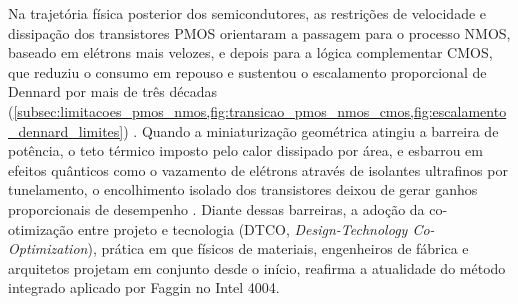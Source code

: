 Na trajetória física posterior dos semicondutores, as restrições de velocidade e dissipação dos transistores PMOS orientaram a passagem para o processo NMOS, baseado em elétrons mais velozes, e depois para a lógica complementar CMOS, que reduziu o consumo em repouso e sustentou o escalamento proporcional de Dennard por mais de três décadas (\cref{subsec:limitacoes_pmos_nmos,fig:transicao_pmos_nmos_cmos,fig:escalamento_dennard_limites}) \cite{dennard1974, mead1980}. Quando a miniaturização geométrica atingiu a barreira de potência, o teto térmico imposto pelo calor dissipado por área, e esbarrou em efeitos quânticos como o vazamento de elétrons através de isolantes ultrafinos por tunelamento, o encolhimento isolado dos transistores deixou de gerar ganhos proporcionais de desempenho \cite{cavin2012}. Diante dessas barreiras, a adoção da co-otimização entre projeto e tecnologia (DTCO, \textit{Design-Technology Co-Optimization}), prática em que físicos de materiais, engenheiros de fábrica e arquitetos projetam em conjunto desde o início, reafirma a atualidade do método integrado aplicado por Faggin no Intel 4004.
